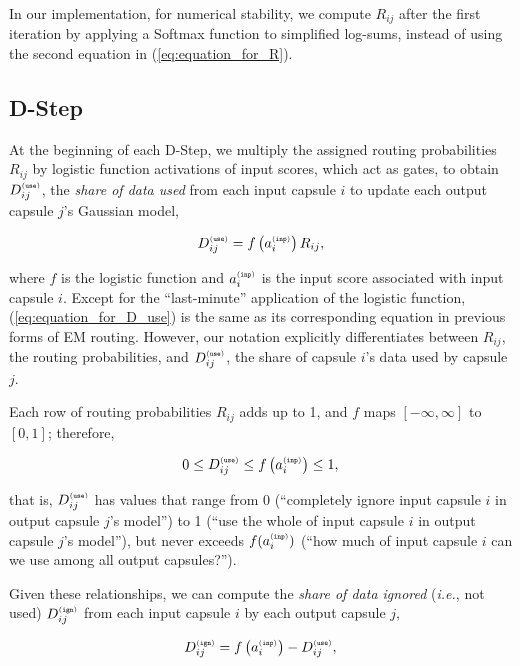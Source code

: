\documentclass[11pt,a4paper]{article}
\newcommand{\suptag}[1]{^{{\scriptscriptstyle\tt (#1)}}}
\begin{document}
In our implementation, for numerical stability, we compute $R_{ij}$ after the first iteration by applying a Softmax function to simplified log-sums, instead of using the second equation in (\ref{eq:equation_for_R}).

\subsection{D-Step}\label{ssec:D_Step}

At the beginning of each D-Step, we multiply the assigned routing probabilities $R_{ij}$ by logistic function activations of input scores, which act as gates, to obtain $D\suptag{use}_{ij}$, the \emph{share of data used} from each input capsule $i$ to update each output capsule $j$'s Gaussian model,

\begin{equation}\label{eq:equation_for_D_use}
D\suptag{use}_{ij} = f \left( a\inp_i \right) R_{ij},
\end{equation}

where $f$ is the logistic function and $a\inp_i$ is the input score associated with input capsule $i$. Except for the ``last-minute'' application of the logistic function, (\ref{eq:equation_for_D_use}) is the same as its corresponding equation in previous forms of EM routing. However, our notation explicitly differentiates between $R_{ij}$, the routing probabilities, and $D\suptag{use}_{ij}$, the share of capsule $i$'s data used by capsule $j$.

Each row of routing probabilities $R_{ij}$ adds up to 1, and $f$ maps $[-\infty, \infty]$ to $[0,1]$; therefore,

\begin{equation}\label{equation_for_D_use_le_ainp_le_1}
0 \le D\suptag{use}_{ij} \le f \left( a\inp_i \right) \le 1,
\end{equation}

that is, $D\suptag{use}_{ij}$ has values that range from 0 (``completely ignore input capsule $i$ in output capsule $j$'s model'') to 1 (``use the whole of input capsule $i$ in output capsule $j$'s model''), but never exceeds $f(a\inp_i)$ (``how much of input capsule $i$ can we use among all output capsules?'').

Given these relationships, we can compute the \emph{share of data ignored} ({\em i.e.}, not used) $D\suptag{ign}_{ij}$ from each input capsule $i$ by each output capsule $j$,

\begin{equation}\label{eq:equation_for_D_ign}
D\suptag{ign}_{ij} = f \left( a\inp_i \right) - D\suptag{use}_{ij},
\end{equation}
\end{document}
